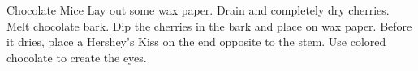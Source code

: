 \documentclass[../main.tex]{subfiles}
\begin{document}
\begin{recipe}{Chocolate Mice}{}{}
    Lay out some wax paper.
    Drain and completely dry cherries.
    Melt chocolate bark. Dip the cherries in the bark and place on wax paper.
    Before it dries, place a Hershey's Kiss on the end opposite to the stem.
    Use colored chocolate to create the eyes.
\end{recipe}
\end{document}
